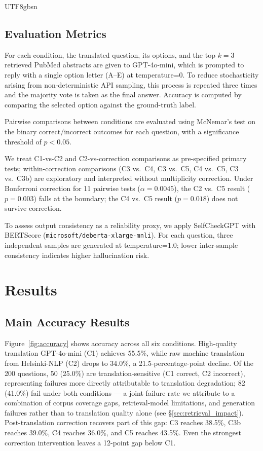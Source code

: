 \documentclass[11pt]{article}
\begin{document}
\begin{CJK}{UTF8}{gbsn}
\subsection{Evaluation Metrics}
For each condition, the translated question, its options, and the top $k=3$ retrieved PubMed abstracts are given to GPT-4o-mini, which is prompted to reply with a single option letter (A--E) at temperature=0. To reduce stochasticity arising from non-deterministic API sampling, this process is repeated three times and the majority vote is taken as the final answer. Accuracy is computed by comparing the selected option against the ground-truth label.

Pairwise comparisons between conditions are evaluated using McNemar's test on the binary correct/incorrect outcomes for each question, with a significance threshold of $p < 0.05$.

We treat C1-vs-C2 and C2-vs-correction comparisons as pre-specified primary tests; within-correction comparisons (C3 vs.\ C4, C3 vs.\ C5, C4 vs.\ C5, C3 vs.\ C3b) are exploratory and interpreted without multiplicity correction. Under Bonferroni correction for 11 pairwise tests ($\alpha = 0.0045$), the C2 vs.\ C5 result ($p = 0.003$) falls at the boundary; the C4 vs.\ C5 result ($p = 0.018$) does not survive correction.

To assess output consistency as a reliability proxy, we apply SelfCheckGPT \cite{manakul-etal-2023-selfcheckgpt} with BERTScore (\texttt{microsoft/deberta-xlarge-mnli}). For each question, three independent samples are generated at temperature=1.0; lower inter-sample consistency indicates higher hallucination risk.

\section{Results}
\label{sec:results}
\subsection{Main Accuracy Results}
Figure~\ref{fig:accuracy} shows accuracy across all six conditions. High-quality translation GPT-4o-mini (C1) achieves 55.5\%, while raw machine translation from Helsinki-NLP (C2) drops to 34.0\%, a 21.5-percentage-point decline. Of the 200 questions, 50 (25.0\%) are translation-sensitive (C1 correct, C2 incorrect), representing failures more directly attributable to translation degradation; 82 (41.0\%) fail under both conditions --- a joint failure rate we attribute to a combination of corpus coverage gaps, retrieval-model limitations, and generation failures rather than to translation quality alone (see \S\ref{sec:retrieval_impact}). Post-translation correction recovers part of this gap: C3 reaches 38.5\%, C3b reaches 39.0\%, C4 reaches 36.0\%, and C5 reaches 43.5\%. Even the strongest correction intervention leaves a 12-point gap below C1.


\end{CJK}
\end{document}
